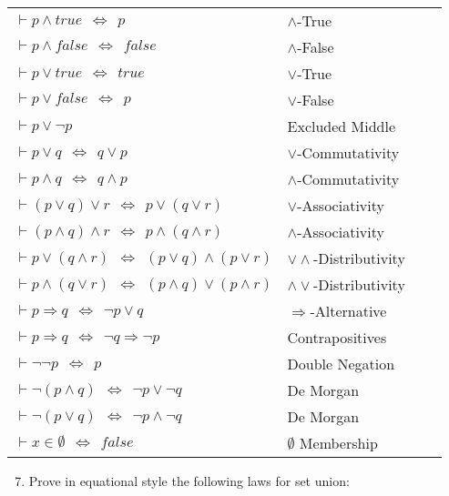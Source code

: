 \documentclass{article}
\renewcommand{\implies}{\Rightarrow}
\renewcommand{\iff}{\Leftrightarrow}
\begin{document}
\begin{enumerate}[\bf I.]
\begin{tabular}{llll}
$\vdash p \land \mathit{true} ~~\iff~~ p$   &$\land$-True\\
$\vdash p \land \mathit{false} ~~\iff~~ \mathit{false}$
&$\land$-False\\
$\vdash p \lor \mathit{true} ~~\iff~~ \mathit{true}$ &$\lor$-True\\
$\vdash p \lor \mathit{false} ~~\iff~~ p$ & $\lor$-False\\
$\vdash p \lor \neg p$  &Excluded Middle\\
$\vdash p \lor q ~~\iff~~ q \lor p$ & $\lor$-Commutativity\\
$\vdash p \land q ~~\iff~~ q \land p$ &$\land$-Commutativity\\
$\vdash (p \lor q) \lor r ~~\iff~~ p \lor (q \lor r)$ &$\lor$-Associativity\\
$\vdash (p \land q) \land r ~~\iff~~ p \land (q \land r)$
&$\land$-Associativity\\
$\vdash p \lor (q \land r) ~~\iff~~ (p \lor q) \land (p \lor r)$
&$\lor\land$-Distributivity\\
$\vdash p \land (q \lor r) ~~\iff~~ (p \land q) \lor (p \land r)$
&$\land\lor$-Distributivity\\
$\vdash p \implies q ~~\iff~~ \neg p \lor q$ &$\implies$-Alternative\\
$\vdash p \implies q ~~\iff~~ \neg q \implies \neg p$
&Contrapositives\\
$\vdash \neg\neg p ~~\iff~~ p$   &Double Negation\\
$\vdash \neg(p \land q) ~~\iff~~ \neg p \lor \neg q$&De Morgan\\
$\vdash \neg(p \lor q) ~~\iff~~ \neg p \land \neg q$& De Morgan\\
$\vdash x\in\emptyset ~~\iff~~ \mathit{false}$& $\emptyset$ Membership\\
\end{tabular}
\begin{enumerate}[1.]\setcounter{enumii}{6}
\item Prove in equational style the following laws for set union:


\end{enumerate}
\end{enumerate}
\end{document}

